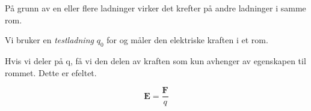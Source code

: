 På grunn av en eller flere ladninger virker det krefter på andre ladninger
i samme rom.

Vi bruker en \emph{testladning} $q_0$ for
og måler den elektriske kraften i et rom.

Hvis vi deler på q, få vi den delen av kraften som kun avhenger
av egenskapen til rommet.
Dette er efeltet.

$$\mathbf{E} = \frac{\mathbf{F}}{q}$$
